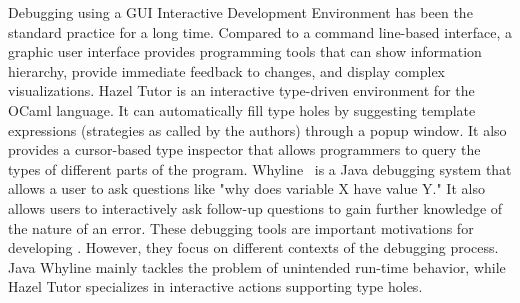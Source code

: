 

Debugging using a GUI Interactive Development Environment has been the standard practice for a long time. Compared to a command line-based interface, a graphic user interface provides programming tools that can show information hierarchy, provide immediate feedback to changes, and display complex visualizations. Hazel Tutor \cite{potter_hazel_2020} is an interactive type-driven environment for the OCaml language. It can automatically fill type holes by suggesting template expressions (strategies as called by the authors) through a popup window. It also provides a cursor-based type inspector that allows programmers to query the types of different parts of the program. Whyline~\cite{ko_finding_2009} is a Java debugging system that allows a user to ask questions like "why does variable X have value Y." It also allows users to interactively ask follow-up questions to gain further knowledge of the nature of an error.  These debugging tools are important motivations for developing \chameleon{}. However, they focus on different contexts of the debugging process. Java Whyline mainly tackles the problem of unintended run-time behavior, while Hazel Tutor specializes in interactive actions supporting type holes.


